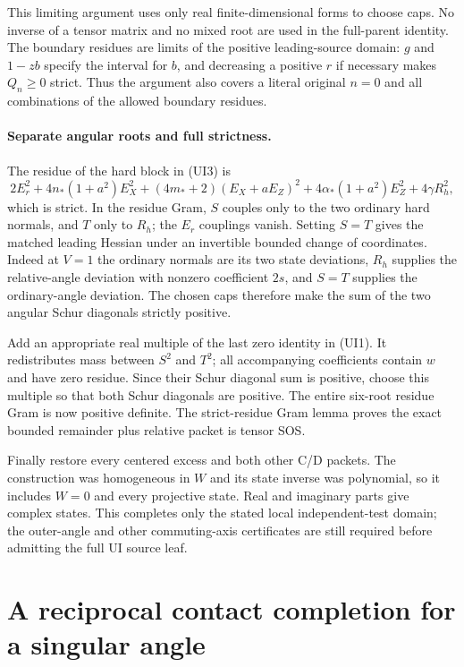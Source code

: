 This limiting argument uses only real finite-dimensional forms to
choose caps. No inverse of a tensor matrix and no mixed root are
used in the full-parent identity. The boundary residues are limits
of the positive leading-source domain: $g$ and $1-zb$ specify the
interval for $b$, and decreasing a positive $r$ if necessary makes
$Q_n\ge0$ strict. Thus the argument also covers a literal original
$n=0$ and all combinations of the allowed boundary residues.

\paragraph{Separate angular roots and full strictness.}
The residue of the hard block in (UI3) is
\[
 2E_r^2+4n_*(1+a^2)E_X^2
 +(4m_*+2)(E_X+aE_Z)^2+4\alpha_*(1+a^2)E_Z^2
 +4\gamma R_h^2,
\]
which is strict. In the residue Gram, $S$ couples only to the two
ordinary hard normals, and $T$ only to $R_h$; the $E_r$ couplings
vanish. Setting $S=T$ gives the matched leading Hessian under an
invertible bounded change of coordinates. Indeed at $V=1$ the
ordinary normals are its two state deviations, $R_h$ supplies the
relative-angle deviation with nonzero coefficient $2s$, and
$S=T$ supplies the ordinary-angle deviation. The chosen caps therefore
make the sum of the two angular Schur diagonals strictly positive.

Add an appropriate real multiple of the last zero identity in (UI1).
It redistributes mass between $S^2$ and $T^2$; all accompanying
coefficients contain $w$ and have zero residue. Since their Schur
diagonal sum is positive, choose this multiple so that both Schur
diagonals are positive. The entire six-root residue Gram is now
positive definite. The strict-residue Gram lemma proves the exact
bounded remainder plus relative packet is tensor SOS.

Finally restore every centered excess and both other C/D packets.
The construction was homogeneous in $W$ and its state inverse was
polynomial, so it includes $W=0$ and every projective state. Real and
imaginary parts give complex states. This completes only the stated
local independent-test domain; the outer-angle and other commuting-axis
certificates are still required before admitting the full UI source leaf.


\section{\texorpdfstring{A reciprocal contact completion for a singular angle}{A reciprocal contact completion for a singular angle}}
\label{component:pa142a027a282}

